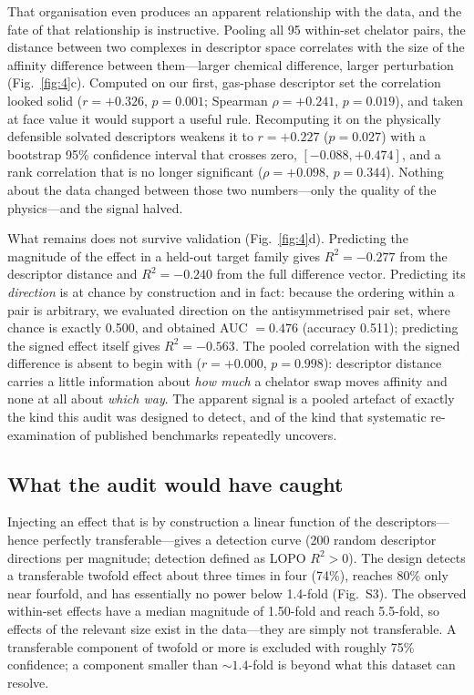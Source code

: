 \documentclass[twoside,twocolumn,9pt]{article}
\begin{document}
That organisation even produces an apparent relationship with the data, and the fate of that relationship is instructive. Pooling all 95 within-set chelator pairs, the distance between two complexes in descriptor space correlates with the size of the affinity difference between them---larger chemical difference, larger perturbation (Fig.~\ref{fig:4}c). Computed on our first, gas-phase descriptor set the correlation looked solid ($r = +0.326$, $p = 0.001$; Spearman $\rho = +0.241$, $p = 0.019$), and taken at face value it would support a useful rule. Recomputing it on the physically defensible solvated descriptors weakens it to $r = +0.227$ ($p = 0.027$) with a bootstrap 95\% confidence interval that crosses zero, $[-0.088, +0.474]$, and a rank correlation that is no longer significant ($\rho = +0.098$, $p = 0.344$). Nothing about the data changed between those two numbers---only the quality of the physics---and the signal halved.

What remains does not survive validation (Fig.~\ref{fig:4}d). Predicting the magnitude of the effect in a held-out target family gives $R^2 = -0.277$ from the descriptor distance and $R^2 = -0.240$ from the full difference vector. Predicting its \emph{direction} is at chance by construction and in fact: because the ordering within a pair is arbitrary, we evaluated direction on the antisymmetrised pair set, where chance is exactly 0.500, and obtained AUC $= 0.476$ (accuracy 0.511); predicting the signed effect itself gives $R^2 = -0.563$. The pooled correlation with the signed difference is absent to begin with ($r = +0.000$, $p = 0.998$): descriptor distance carries a little information about \emph{how much} a chelator swap moves affinity and none at all about \emph{which way}. The apparent signal is a pooled artefact of exactly the kind this audit was designed to detect, and of the kind that systematic re-examination of published benchmarks repeatedly uncovers.\cite{Schuh2026Audit,McGreivy2024Weak}

\subsection{What the audit would have caught}

Injecting an effect that is by construction a linear function of the descriptors---hence perfectly transferable---gives a detection curve (200 random descriptor directions per magnitude; detection defined as LOPO $R^2 > 0$). The design detects a transferable twofold effect about three times in four (74\%), reaches 80\% only near fourfold, and has essentially no power below 1.4-fold (Fig.~S3). The observed within-set effects have a median magnitude of 1.50-fold and reach 5.5-fold, so effects of the relevant size exist in the data---they are simply not transferable. A transferable component of twofold or more is excluded with roughly 75\% confidence; a component smaller than ${\sim}1.4$-fold is beyond what this dataset can resolve.
\end{document}
